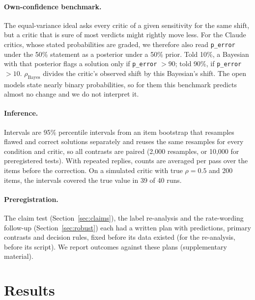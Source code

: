 \documentclass[letterpaper]{article} %
\begin{document}
\paragraph{Own-confidence benchmark.} The equal-variance ideal asks every critic of a given sensitivity for the same shift, but a critic that is sure of most verdicts might rightly move less. For the Claude critics, whose stated probabilities are graded, we therefore also read \texttt{p\_error} under the 50\% statement as a posterior under a 50\% prior. Told 10\%, a Bayesian with that posterior flags a solution only if \texttt{p\_error} $>90$; told 90\%, if \texttt{p\_error} $>10$. $\rho_{\mathrm{Bayes}}$ divides the critic's observed shift by this Bayesian's shift. The open models state nearly binary probabilities, so for them this benchmark predicts almost no change and we do not interpret it.

\paragraph{Inference.} Intervals are 95\% percentile intervals from an item bootstrap that resamples flawed and correct solutions separately and reuses the same resamples for every condition and critic, so all contrasts are paired (2,000 resamples, or 10,000 for preregistered tests). With repeated replies, counts are averaged per pass over the items before the correction. On a simulated critic with true $\rho=0.5$ and 200 items, the intervals covered the true value in 39 of 40 runs.

\paragraph{Preregistration.} The claim test (Section~\ref{sec:claims}), the label re-analysis and the rate-wording follow-up (Section~\ref{sec:robust}) each had a written plan with predictions, primary contrasts and decision rules, fixed before its data existed (for the re-analysis, before its script). We report outcomes against these plans (supplementary material).

\section{Results}
\end{document}

